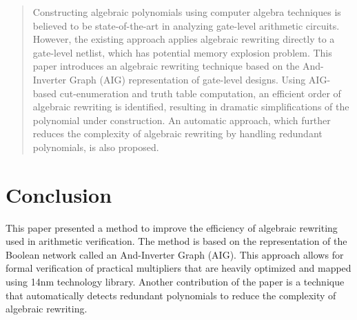 \documentclass[journal]{IEEEtran}
\begin{document}
\begin{abstract}
Constructing algebraic polynomials using computer algebra techniques is believed to be state-of-the-art in analyzing gate-level arithmetic circuits. However, the existing approach applies algebraic rewriting directly to a gate-level netlist, which has potential memory explosion problem. This paper introduces an algebraic rewriting technique based on the And-Inverter Graph (AIG) representation of gate-level designs. Using AIG-based cut-enumeration and truth table computation, an efficient order of algebraic rewriting is identified, resulting in dramatic simplifications of the polynomial under construction. An automatic approach, which further reduces the complexity of algebraic rewriting by handling redundant polynomials, is also proposed. 
\end{abstract}






\maketitle

\IEEEdisplaynontitleabstractindextext

\IEEEpeerreviewmaketitle

\vspace{-3mm}

\section{Conclusion}
This paper presented a method to improve the efficiency of algebraic rewriting used in arithmetic verification. The method is based on the representation of the Boolean network called an And-Inverter Graph (AIG). This approach allows for formal verification of practical multipliers that are heavily optimized and mapped using 14nm technology library. Another contribution of the paper is a technique that automatically detects redundant polynomials to reduce the complexity of algebraic rewriting.
\end{document}
